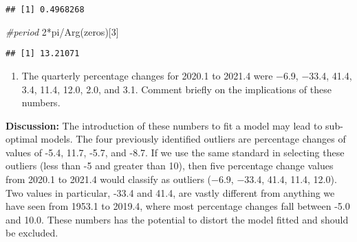 \documentclass[
]{article}
\newenvironment{Shaded}{\begin{snugshade}}{\end{snugshade}}
\newcommand{\CommentTok}[1]{\textcolor[rgb]{0.56,0.35,0.01}{\textit{#1}}}
\newcommand{\DecValTok}[1]{\textcolor[rgb]{0.00,0.00,0.81}{#1}}
\newcommand{\FunctionTok}[1]{\textcolor[rgb]{0.00,0.00,0.00}{#1}}
\newcommand{\NormalTok}[1]{#1}
\newcommand{\SpecialCharTok}[1]{\textcolor[rgb]{0.00,0.00,0.00}{#1}}
\providecommand{\tightlist}{%
  \setlength{\itemsep}{0pt}\setlength{\parskip}{0pt}}
\begin{document}
\begin{verbatim}
## [1] 0.4968268
\end{verbatim}

\begin{Shaded}
\begin{Highlighting}[]
\CommentTok{\#period}
\DecValTok{2}\SpecialCharTok{*}\NormalTok{pi}\SpecialCharTok{/}\FunctionTok{Arg}\NormalTok{(zeros)[}\DecValTok{3}\NormalTok{]}
\end{Highlighting}
\end{Shaded}

\begin{verbatim}
## [1] 13.21071
\end{verbatim}

\begin{enumerate}
\def\labelenumi{(\alph{enumi})}
\setcounter{enumi}{2}
\tightlist
\item
  The quarterly percentage changes for 2020.1 to 2021.4 were −6.9,
  −33.4, 41.4, 3.4, 11.4, 12.0, 2.0, and 3.1. Comment briefly on the
  implications of these numbers.
\end{enumerate}

\textbf{Discussion:} The introduction of these numbers to fit a model
may lead to sub-optimal models. The four previously identified outliers
are percentage changes of values of -5.4, 11.7, -5.7, and -8.7. If we
use the same standard in selecting these outliers (less than -5 and
greater than 10), then five percentage change values from 2020.1 to
2021.4 would classify as outliers (−6.9, −33.4, 41.4, 11.4, 12.0). Two
values in particular, -33.4 and 41.4, are vastly different from anything
we have seen from 1953.1 to 2019.4, where most percentage changes fall
between -5.0 and 10.0. These numbers has the potential to distort the
model fitted and should be excluded.
\end{document}
